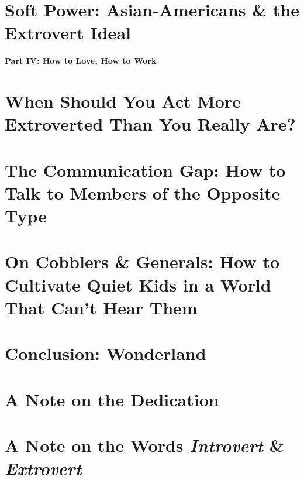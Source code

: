 \documentclass{article}
\numberwithin{equation}{section}
\begin{document}
\section{Soft Power: Asian-Americans \& the Extrovert Ideal}


\begin{center}\LARGE\sf
	\textbf{Part IV: How to Love, How to Work}
\end{center}

\section{When Should You Act More Extroverted Than You Really Are?}


\section{The Communication Gap: How to Talk to Members of the Opposite Type}


\section{On Cobblers \& Generals: How to Cultivate Quiet Kids in a World That Can't Hear Them}


\section{Conclusion: Wonderland}


\section{A Note on the Dedication}


\section{A Note on the Words \textit{Introvert} \& \textit{Extrovert}}


\printbibliography[heading=bibintoc]
	
\end{document}

